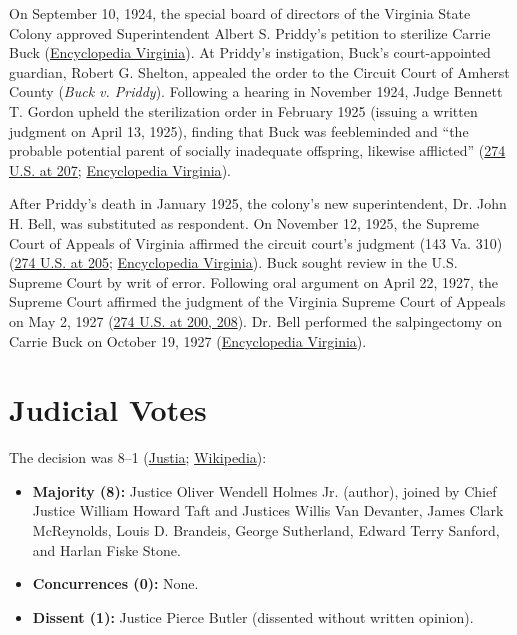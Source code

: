 \documentclass[12pt]{article}
\begin{document}
On September 10, 1924, the special board of directors of the Virginia State Colony approved Superintendent Albert S. Priddy's petition to sterilize Carrie Buck (\href{https://encyclopediavirginia.org/entries/buck-v-bell-1927/}{Encyclopedia Virginia}). At Priddy's instigation, Buck's court-appointed guardian, Robert G. Shelton, appealed the order to the Circuit Court of Amherst County (\textit{Buck v. Priddy}). Following a hearing in November 1924, Judge Bennett T. Gordon upheld the sterilization order in February 1925 (issuing a written judgment on April 13, 1925), finding that Buck was feebleminded and ``the probable potential parent of socially inadequate offspring, likewise afflicted'' (\href{https://supreme.justia.com/cases/federal/us/274/200/}{274 U.S. at 207}; \href{https://encyclopediavirginia.org/entries/buck-v-bell-1927/}{Encyclopedia Virginia}).

After Priddy's death in January 1925, the colony's new superintendent, Dr. John H. Bell, was substituted as respondent. On November 12, 1925, the Supreme Court of Appeals of Virginia affirmed the circuit court's judgment (143 Va. 310) (\href{https://supreme.justia.com/cases/federal/us/274/200/}{274 U.S. at 205}; \href{https://encyclopediavirginia.org/entries/buck-v-bell-1927/}{Encyclopedia Virginia}). Buck sought review in the U.S. Supreme Court by writ of error. Following oral argument on April 22, 1927, the Supreme Court affirmed the judgment of the Virginia Supreme Court of Appeals on May 2, 1927 (\href{https://supreme.justia.com/cases/federal/us/274/200/}{274 U.S. at 200, 208}). Dr. Bell performed the salpingectomy on Carrie Buck on October 19, 1927 (\href{https://encyclopediavirginia.org/entries/buck-v-bell-1927/}{Encyclopedia Virginia}).

\section{Judicial Votes}

The decision was 8--1 (\href{https://supreme.justia.com/cases/federal/us/274/200/}{Justia}; \href{https://en.wikipedia.org/wiki/Buck_v._Bell}{Wikipedia}):
\begin{itemize}
  \item \textbf{Majority (8):} Justice Oliver Wendell Holmes Jr. (author), joined by Chief Justice William Howard Taft and Justices Willis Van Devanter, James Clark McReynolds, Louis D. Brandeis, George Sutherland, Edward Terry Sanford, and Harlan Fiske Stone.
  \item \textbf{Concurrences (0):} None.
  \item \textbf{Dissent (1):} Justice Pierce Butler (dissented without written opinion).
\end{itemize}
\end{document}
